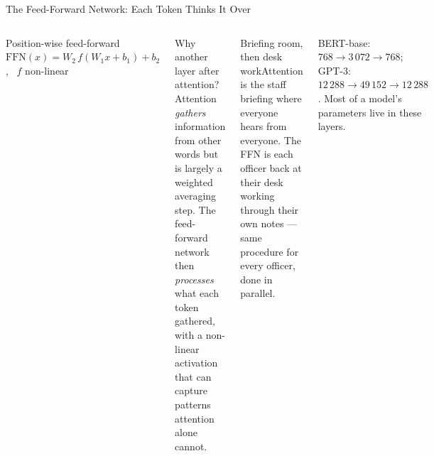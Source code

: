 \documentclass[aspectratio=169,10pt]{beamer}
\begin{document}
\begin{frame}{The Feed-Forward Network: Each Token Thinks It Over}
\begin{columns}[T]
\begin{fbx}{Position-wise feed-forward}
$\text{FFN}(x)=W_2\,f(W_1x+b_1)+b_2$, \ $f$ non-linear
\end{fbx}
\begin{cbox}{Why another layer after attention?}\scriptsize Attention \emph{gathers} information from other words but is largely a weighted averaging step. The feed-forward network then \emph{processes} what each token gathered, with a non-linear activation that can capture patterns attention alone cannot.\end{cbox}
\begin{cbox}{Briefing room, then desk work}\scriptsize Attention is the staff briefing where everyone hears from everyone. The FFN is each officer back at their desk working through their own notes --- same procedure for every officer, done in parallel.\end{cbox}
\begin{ibox}\scriptsize BERT-base: $768\to3\,072\to768$; GPT-3: $12\,288\to49\,152\to12\,288$. Most of a model's parameters live in these layers.\end{ibox}
\end{columns}
\end{frame}
\end{document}
